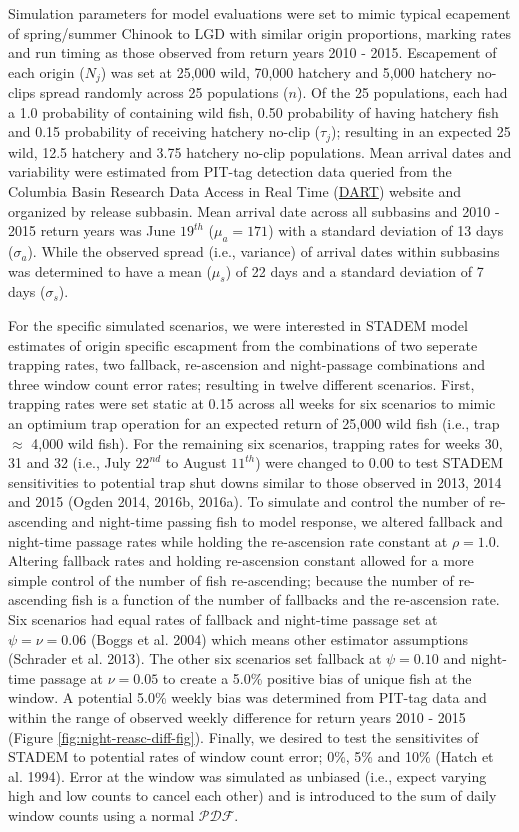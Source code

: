 \documentclass[
  12pt,
]{article}
\begin{document}
Simulation parameters for model evaluations were set to mimic typical ecapement of spring/summer Chinook to LGD with similar origin proportions, marking rates and run timing as those observed from return years 2010 - 2015. Escapement of each origin (\(N_j\)) was set at 25,000 wild, 70,000 hatchery and 5,000 hatchery no-clips spread randomly across 25 populations (\(n\)). Of the 25 populations, each had a 1.0 probability of containing wild fish, 0.50 probability of having hatchery fish and 0.15 probability of receiving hatchery no-clip (\(\tau_j\)); resulting in an expected 25 wild, 12.5 hatchery and 3.75 hatchery no-clip populations. Mean arrival dates and variability were estimated from PIT-tag detection data queried from the Columbia Basin Research Data Access in Real Time (\href{http://www.cbr.washington.edu/dart/query/pit_adult_window}{DART}) website and organized by release subbasin. Mean arrival date across all subbasins and 2010 - 2015 return years was June \(19^{th}\) (\(\mu_a = 171\)) with a standard deviation of 13 days (\(\sigma_a\)). While the observed spread (i.e., variance) of arrival dates within subbasins was determined to have a mean (\(\mu_s\)) of 22 days and a standard deviation of 7 days (\(\sigma_s\)).

For the specific simulated scenarios, we were interested in STADEM model estimates of origin specific escapment from the combinations of two seperate trapping rates, two fallback, re-ascension and night-passage combinations and three window count error rates; resulting in twelve different scenarios. First, trapping rates were set static at 0.15 across all weeks for six scenarios to mimic an optimium trap operation for an expected return of 25,000 wild fish (i.e., trap \(\approx\) 4,000 wild fish). For the remaining six scenarios, trapping rates for weeks 30, 31 and 32 (i.e., July \(22^{nd}\) to August \(11^{th}\)) were changed to 0.00 to test STADEM sensitivities to potential trap shut downs similar to those observed in 2013, 2014 and 2015 (Ogden 2014, 2016b, 2016a). To simulate and control the number of re-ascending and night-time passing fish to model response, we altered fallback and night-time passage rates while holding the re-ascension rate constant at \(\rho = 1.0\). Altering fallback rates and holding re-ascension constant allowed for a more simple control of the number of fish re-ascending; because the number of re-ascending fish is a function of the number of fallbacks and the re-ascension rate. Six scenarios had equal rates of fallback and night-time passage set at \(\psi = \nu = 0.06\) (Boggs et al. 2004) which means other estimator assumptions (Schrader et al. 2013). The other six scenarios set fallback at \(\psi = 0.10\) and night-time passage at \(\nu = 0.05\) to create a 5.0\% positive bias of unique fish at the window. A potential 5.0\% weekly bias was determined from PIT-tag data and within the range of observed weekly difference for return years 2010 - 2015 (Figure \ref{fig:night-reasc-diff-fig}). Finally, we desired to test the sensitivites of STADEM to potential rates of window count error; 0\%, 5\% and 10\% (Hatch et al. 1994). Error at the window was simulated as unbiased (i.e., expect varying high and low counts to cancel each other) and is introduced to the sum of daily window counts using a normal \(\mathcal{PDF}\).
\end{document}
